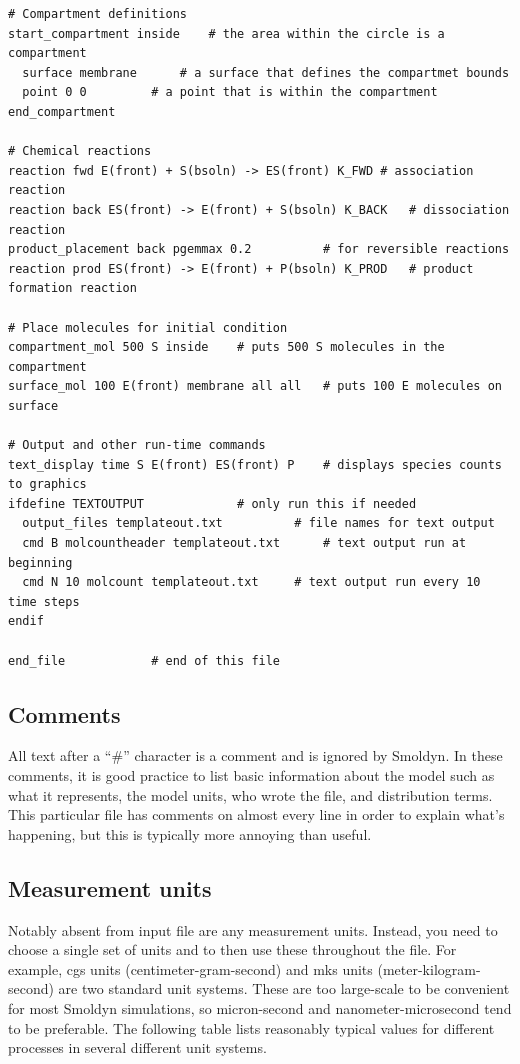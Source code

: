 \documentclass {scrbook}
\begin{document}
\begin{lstlisting}[style=SSAC]
# Compartment definitions
start_compartment inside	# the area within the circle is a compartment
  surface membrane		# a surface that defines the compartmet bounds
  point 0 0			# a point that is within the compartment
end_compartment

# Chemical reactions
reaction fwd E(front) + S(bsoln) -> ES(front) K_FWD	# association reaction
reaction back ES(front) -> E(front) + S(bsoln) K_BACK 	# dissociation reaction
product_placement back pgemmax 0.2			# for reversible reactions
reaction prod ES(front) -> E(front) + P(bsoln) K_PROD	# product formation reaction

# Place molecules for initial condition
compartment_mol 500 S inside	# puts 500 S molecules in the compartment
surface_mol 100 E(front) membrane all all	# puts 100 E molecules on surface

# Output and other run-time commands
text_display time S E(front) ES(front) P	# displays species counts to graphics
ifdefine TEXTOUTPUT				# only run this if needed
  output_files templateout.txt			# file names for text output
  cmd B molcountheader templateout.txt		# text output run at beginning
  cmd N 10 molcount templateout.txt		# text output run every 10 time steps
endif

end_file			# end of this file
\end{lstlisting}

\subsection*{Comments}

All text after a ``\#'' character is a comment and is ignored by Smoldyn.  In these comments, it is good practice to list basic information about the model such as what it represents, the model units, who wrote the file, and distribution terms.  This particular file has comments on almost every line in order to explain what's happening, but this is typically more annoying than useful.

\subsection*{Measurement units}

Notably absent from input file are any measurement units. Instead, you need to choose a single set of units and to then use these throughout the file. For example, cgs units (centimeter-gram-second) and mks units (meter-kilogram-second) are two standard unit systems. These are too large-scale to be convenient for most Smoldyn simulations, so micron-second and nanometer-microsecond tend to be preferable. The following table lists reasonably typical values for different processes in several different unit systems.
\end{document}
